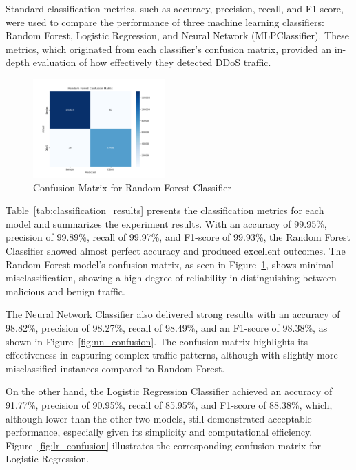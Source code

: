 \documentclass[conference]{IEEEtran}
\begin{document}
Standard classification metrics, such as accuracy, precision, recall, and F1-score, were used to compare the performance of three machine learning classifiers: Random Forest, Logistic Regression, and Neural Network (MLPClassifier). These metrics, which originated from each classifier's confusion matrix, provided an in-depth evaluation of how effectively they detected DDoS traffic.

\begin{figure}[htbp]
\centerline{\includegraphics[width=0.45\textwidth]{Random_Forest_CM.png}}
\caption{Confusion Matrix for Random Forest Classifier}
\label{fig:rf_confusion}
\end{figure}

Table~\ref{tab:classification_results} presents the classification metrics for each model and summarizes the experiment results. With an accuracy of 99.95\%, precision of 99.89\%, recall of 99.97\%, and F1-score of 99.93\%, the Random Forest Classifier showed almost perfect accuracy and produced excellent outcomes. The Random Forest model's confusion matrix, as seen in Figure~\ref{fig:rf_confusion}, shows minimal misclassification, showing a high degree of reliability in distinguishing between malicious and benign traffic.

The Neural Network Classifier also delivered strong results with an accuracy of 98.82\%, precision of 98.27\%, recall of 98.49\%, and an F1-score of 98.38\%, as shown in Figure~\ref{fig:nn_confusion}. The confusion matrix highlights its effectiveness in capturing complex traffic patterns, although with slightly more misclassified instances compared to Random Forest.

On the other hand, the Logistic Regression Classifier achieved an accuracy of 91.77\%, precision of 90.95\%, recall of 85.95\%, and F1-score of 88.38\%, which, although lower than the other two models, still demonstrated acceptable performance, especially given its simplicity and computational efficiency. Figure~\ref{fig:lr_confusion} illustrates the corresponding confusion matrix for Logistic Regression.
\end{document}
